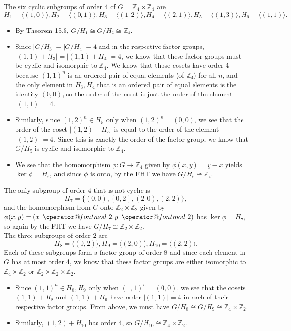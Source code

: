 \documentclass{article}
\makeatletter
\newenvironment{problem1}[1]{\noindent {\bf Problem #1:}}
{\medskip}
\def\imod#1{\allowbreak\mkern8mu{\operator@font mod}\,\,#1}
\makeatother
\begin{document}
\begin{problem1}{16} The six cyclic subgroups of order 4 of $G=\mathbb{Z}_4\times\mathbb{Z}_4$ are $$H_1=\langle (1,0) \rangle, H_2=\langle (0,1) \rangle, H_3=\langle (1,2) \rangle, H_4=\langle (2,1) \rangle, H_5=\langle (1,3) \rangle, H_6=\langle (1,1) \rangle.$$
\begin{itemize}
\item{By Theorem 15.8, $G/H_1\cong G/H_2 \cong \mathbb{Z}_4$.}
\item{Since $|G/H_3|=|G/H_4|=4$ and in the respective factor groups, $|(1,1)+H_3|=|(1,1)+H_4|=4$, we know that these factor groups must be cyclic and isomorphic to $\mathbb{Z}_4$. We know that those cosets have order 4 because $(1,1)^n$ is an ordered pair of equal elements (of $\mathbb{Z}_4$) for all $n$, and the only element in $H_3,H_4$ that is an ordered pair of equal elements is the identity $(0,0)$, so the order of the coset is just the order of the element $|(1,1)|=4$.}
\item{Similarly, since $(1,2)^n \in H_5$ only when $(1,2)^n=(0,0)$, we see that the order of the coset $|(1,2)+H_5|$ is equal to the order of the element $|(1,2)|=4$. Since this is exactly the order of the factor group, we know that $G/H_5$ is cyclic and isomorphic to $\mathbb{Z}_4$.}
\item{We see that the homomorphism $\phi:G\to\mathbb{Z}_4$ given by $\phi(x,y)=y-x$ yields $\ker\phi=H_6$, and since $\phi$ is onto, by the FHT we have $G/H_6\cong\mathbb{Z}_4.$}
\end{itemize}
The only subgroup of order 4 that is not cyclic is $$H_7=\{(0,0),(0,2),(2,0),(2,2)\},$$ and the homomorphism from $G$ onto $\mathbb{Z}_2\times\mathbb{Z}_2$ given by $\phi(x,y)=(x\imod{2},y\imod{2})$ has $\ker\phi=H_7$, so again by the FHT we have $G/H_7\cong \mathbb{Z}_2\times\mathbb{Z}_2$.\\

\noindent The three subgroups of order 2 are $$H_8=\langle (0,2) \rangle, H_9=\langle (2,0) \rangle, H_{10}= \langle (2,2)\rangle.$$ Each of these subgroups form a factor group of order 8 and since each element in $G$ has at most order 4, we know that these factor groups are either isomorphic to $\mathbb{Z}_4\times\mathbb{Z}_2$ or $\mathbb{Z}_2\times\mathbb{Z}_2\times\mathbb{Z}_2$.
\begin{itemize}
\item{Since $(1,1)^n\in H_8,H_9$ only when $(1,1)^n=(0,0)$, we see that the cosets $(1,1)+H_8$ and $(1,1)+H_9$ have order $|(1,1)|=4$ in each of their respective factor groups. From above, we must have $G/H_8\cong G/H_9 \cong \mathbb{Z}_4\times\mathbb{Z}_2$.}
\item{Similarly, $(1,2)+H_{10}$ has order 4, so $G/H_{10}\cong  \mathbb{Z}_4\times\mathbb{Z}_2$.}
\end{itemize}
\end{problem1}
\end{document}
